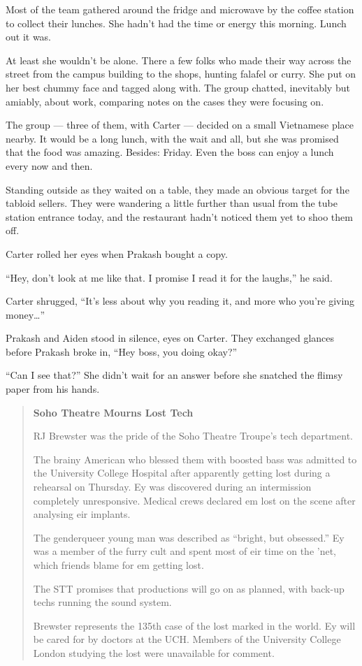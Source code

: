 Most of the team gathered around the fridge and microwave by the coffee station to collect their lunches. She hadn't had the time or energy this morning. Lunch out it was.

At least she wouldn't be alone. There a few folks who made their way across the street from the campus building to the shops, hunting falafel or curry. She put on her best chummy face and tagged along with. The group chatted, inevitably but amiably, about work, comparing notes on the cases they were focusing on.

The group — three of them, with Carter — decided on a small Vietnamese place nearby. It would be a long lunch, with the wait and all, but she was promised that the food was amazing. Besides: Friday. Even the boss can enjoy a lunch every now and then.

Standing outside as they waited on a table, they made an obvious target for the tabloid sellers. They were wandering a little further than usual from the tube station entrance today, and the restaurant hadn't noticed them yet to shoo them off.

Carter rolled her eyes when Prakash bought a copy.

``Hey, don't look at me like that. I promise I read it for the laughs,'' he said.

Carter shrugged, ``It's less about why you reading it, and more who you're giving money\ldots{}''

Prakash and Aiden stood in silence, eyes on Carter. They exchanged glances before Prakash broke in, ``Hey boss, you doing okay?''

``Can I see that?'' She didn't wait for an answer before she snatched the flimsy paper from his hands.

\begin{quote}
\textbf{Soho Theatre Mourns Lost Tech}

RJ Brewster was the pride of the Soho Theatre Troupe's tech department.

The brainy American who blessed them with boosted bass was admitted to the University College Hospital after apparently getting lost during a rehearsal on Thursday. Ey was discovered during an intermission completely unresponsive. Medical crews declared em lost on the scene after analysing eir implants.

The genderqueer young man was described as ``bright, but obsessed.'' Ey was a member of the furry cult and spent most of eir time on the 'net, which friends blame for em getting lost.

The STT promises that productions will go on as planned, with back-up techs running the sound system.

Brewster represents the 135th case of the lost marked in the world. Ey will be cared for by doctors at the UCH. Members of the University College London studying the lost were unavailable for comment.
\end{quote}


